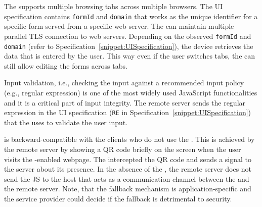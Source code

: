 \parasave
{}
The \device supports multiple browsing tabs across multiple browsers. The UI specification contains \texttt{formId} and \texttt{domain} that works as the unique identifier for a specific form served from a specific web server. The \device can maintain multiple parallel TLS connection to web servers. Depending on the observed \texttt{formId} and \texttt{domain} (refer to Specification~\ref{snippet:UISpecification}), the device retrieves the data that is entered by the user. This way even if the user switches tabs, the \device can still allow editing the forms across tabs.

\parasave
{} Input validation, i.e., checking the input against a recommended input policy (e.g., regular expression) is one of the most widely used JavaScript functionalities and it is a critical part of input integrity. The remote server sends the regular expression in the UI specification (\texttt{RE} in Specification~\ref{snippet:UISpecification}) that the \device uses to validate the user input.


\parasave
{} \name is backward-compatible with the clients who do not use the \device. This is achieved by the remote server by showing a QR code briefly on the screen when the user visits the \name-enabled webpage. The \device intercepted the QR code and sends a signal to the server about its presence. In the absence of the \device, the remote server does not send the \name JS to the host that acts as a communication channel between the \device and the remote server. Note, that the fallback mechanism is application-specific and the service provider could decide if the fallback is detrimental to security.